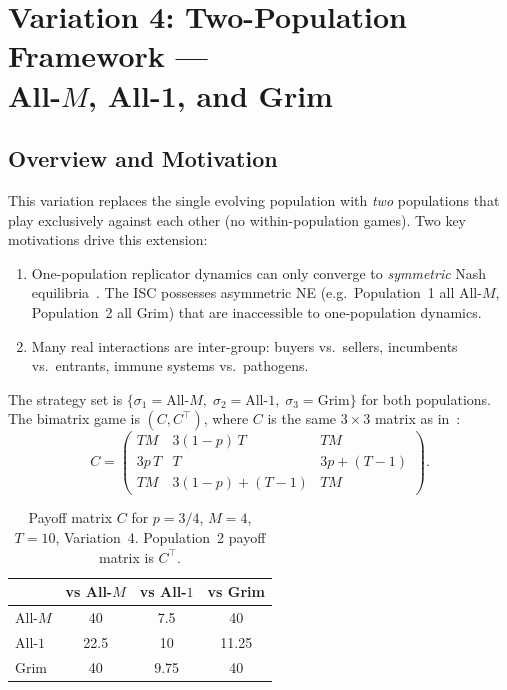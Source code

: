 \documentclass[12pt,a4paper]{article}
\begin{document}
\section{Variation 4: Two-Population Framework ---\\
All-\texorpdfstring{$M$}{M}, All-1, and Grim}
\label{sec:var4}

\subsection{Overview and Motivation}

This variation replaces the single evolving population with \emph{two} populations
that play exclusively against each other (no within-population games). Two key
motivations drive this extension:
\begin{enumerate}
  \item One-population replicator dynamics can only converge to \emph{symmetric}
        Nash equilibria~\cite{Sandholm2010}. The ISC possesses asymmetric NE
        (e.g.\ Population~1 all All-$M$, Population~2 all Grim) that are
        inaccessible to one-population dynamics.
  \item Many real interactions are inter-group: buyers vs.\ sellers, incumbents
        vs.\ entrants, immune systems vs.\ pathogens.
\end{enumerate}

The strategy set is $\{\sigma_1=\text{All-}M,\;\sigma_2=\text{All-}1,\;\sigma_3=\text{Grim}\}$
for both populations. The bimatrix game is $(C, C^\top)$, where $C$ is the same
$3\times3$ matrix as in~\cite{LK2026}:
\begin{equation}
C = \begin{pmatrix}
T M & 3(1-p)\,T & T M \\[4pt]
3p\,T & T & 3p+(T-1) \\[4pt]
T M & 3(1-p)+(T-1) & T M
\end{pmatrix}.
\end{equation}

\begin{table}[H]
\centering
\caption{Payoff matrix $C$ for $p=3/4$, $M=4$, $T=10$, Variation~4.
         Population~2 payoff matrix is $C^\top$.}
\label{tab:v4_C_p075}
\renewcommand{\arraystretch}{1.2}
\begin{tabular}{lccc}
\toprule
           & vs All-$M$ & vs All-$1$ & vs Grim \\
\midrule
All-$M$    & 40 & 7.5  & 40    \\
All-$1$    & 22.5 & 10 & 11.25 \\
Grim       & 40 & 9.75 & 40    \\
\bottomrule
\end{tabular}
\end{table}
\end{document}
